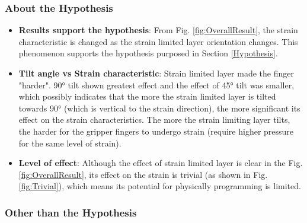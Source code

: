 \documentclass[conference]{IEEEtran}
\begin{document}
\subsubsection{About the Hypothesis}
\begin{itemize}
    \item \textbf{Results support the hypothesis}: From Fig. \ref{fig:OverallResult}, the strain characteristic is changed as the strain limited layer orientation changes. This phenomenon supports the hypothesis purposed in Section \ref{Hypothesis}. 
    \item \textbf{Tilt angle vs Strain characteristic}: Strain limited layer made the finger "harder". 90° tilt shown greatest effect and the effect of 45° tilt was smaller, which possibly indicates that the more the strain limited layer is tilted towards 90° (which is vertical to the strain direction), the more significant its effect on the strain characteristics. The more the strain limiting layer tilts, the harder for the gripper fingers to undergo strain (require higher pressure for the same level of strain). 
    \item \textbf{Level of effect}: Although the effect of strain limited layer is clear in the Fig. \ref{fig:OverallResult}, its effect on the strain is trivial (as shown in Fig. \ref{fig:Trivial}), which means its potential for physically programming is limited.
\end{itemize}

\subsubsection{Other than the Hypothesis}
\label{OtherThanTheHypothesis}
\end{document}
